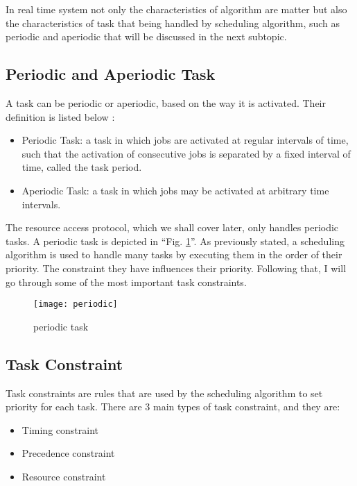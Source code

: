 In real time system not only the characteristics of algorithm are matter but also the characteristics  of task that being handled by scheduling algorithm, such as periodic and aperiodic that will be discussed in the next subtopic.

\subsection{Periodic and Aperiodic Task}

A task can be periodic or aperiodic, based on the way it is activated. Their definition is listed below \cite{b4}:
\begin{itemize}
\item Periodic Task: a task in which jobs are activated at regular intervals of time, such that the activation of consecutive jobs is separated by a fixed interval of time, called the task period.
\item Aperiodic Task: a task in which jobs may be activated at arbitrary time intervals.
\end{itemize}

The resource access protocol, which we shall cover later, only handles periodic tasks. A periodic task is depicted in ``Fig. \ref{fig:periodic}''. As previously stated, a scheduling algorithm is used to handle many tasks by executing them in the order of their priority. The constraint they have influences their priority. Following that, I will go through some of the most important task constraints.

\begin{figure}[ht]
    \centering
    \texttt{[image: periodic]}
    \caption{periodic task \cite{b5}}
    \label{fig:periodic}
\end{figure}

\subsection{Task Constraint}

Task constraints are rules that are used by the scheduling algorithm to set  priority for each task. There are 3 main types of task constraint, and they are:

\begin{itemize}
\item Timing constraint
\item Precedence constraint
\item Resource constraint
\end{itemize}

